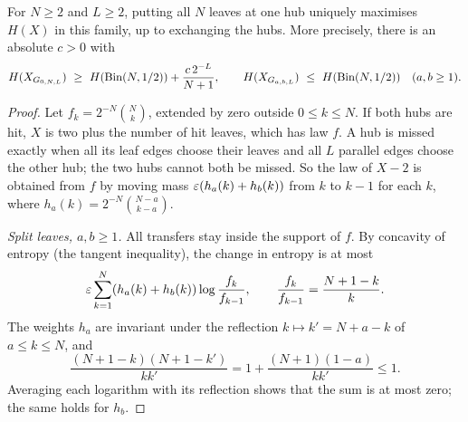 \documentclass[11pt,a4paper]{article}
\theoremstyle{definition}\newtheorem{remark}[theorem]{Remark}\newtheorem{conjecture}{Conjecture}
\begin{document}
\begin{proposition}\label{prop:twohubs}
For $N\ge2$ and $L\ge2$, putting all $N$ leaves at one hub uniquely maximises $H(X)$ in this family, up to exchanging the hubs. More precisely, there is an absolute $c>0$ with
\[
 H(X_{G_{0,N,L}})\ \ge\ H({\rm Bin}(N,1/2))+
                   \frac{c\,2^{-L}}{N+1},\qquad
 H(X_{G_{a,b,L}})\ \le\ H({\rm Bin}(N,1/2))\quad(a,b\ge1).
\]
\end{proposition}
\begin{proof}
Let $f_k=2^{-N}\binom Nk$, extended by zero outside $0\le k\le N$. If both hubs are hit, $X$ is two plus the number of hit leaves, which has law $f$. A hub is missed exactly when all its leaf edges choose their leaves and all $L$ parallel edges choose the other hub; the two hubs cannot both be missed. So the law of $X-2$ is obtained from $f$ by moving mass $\varepsilon(h_a(k)+h_b(k))$ from $k$ to $k-1$ for each $k$, where $h_a(k)=2^{-N}\binom{N-a}{k-a}$.

\emph{Split leaves, $a,b\ge1$.} All transfers stay inside the support of $f$. By concavity of entropy (the tangent inequality), the change in entropy is at most
\[
 \varepsilon\sum_{k=1}^N(h_a(k)+h_b(k))\log\frac{f_k}{f_{k-1}},\qquad \frac{f_k}{f_{k-1}}=\frac{N+1-k}k .
\]
The weights $h_a$ are invariant under the reflection $k\mapsto k'=N+a-k$ of $a\le k\le N$, and
\[
 \frac{(N+1-k)(N+1-k')}{kk'}=1+\frac{(N+1)(1-a)}{kk'}\le1 .
\]
Averaging each logarithm with its reflection shows that the sum is at most zero; the same holds for $h_b$.


\end{proof}
\end{document}
